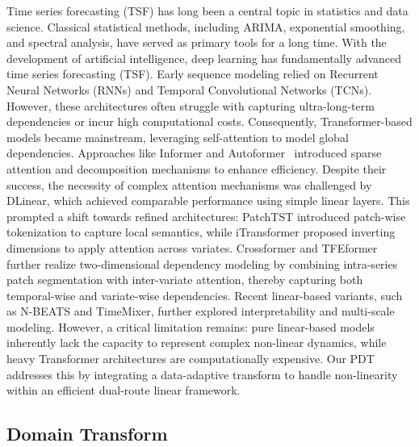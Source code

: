 \documentclass[final,3p,times]{elsarticle}
\begin{document}
Time series forecasting (TSF) has long been a central topic in statistics and data science. Classical statistical methods, including ARIMA\cite{box2015time}, exponential smoothing\cite{gardner1985exponential}, and spectral analysis\cite{koopmans1995spectral}, have served as primary tools for a long time. With the development of artificial intelligence, deep learning has fundamentally advanced time series forecasting (TSF). Early sequence modeling relied on Recurrent Neural Networks (RNNs)\cite{yu2019review,salinas2020deepar} and Temporal Convolutional Networks (TCNs)\cite{bai2018empirical, wu2023timesnet}. However, these architectures often struggle with capturing ultra-long-term dependencies or incur high computational costs. Consequently, Transformer-based models became mainstream, leveraging self-attention to model global dependencies\cite{wen2023trans}. Approaches like Informer\cite{zhou2021informer} and Autoformer~\cite{wu2021autoformer} introduced sparse attention and decomposition mechanisms to enhance efficiency. Despite their success, the necessity of complex attention mechanisms was challenged by DLinear\cite{zeng2023transformers}, which achieved comparable performance using simple linear layers. This prompted a shift towards refined architectures: PatchTST\cite{nie2023a} introduced patch-wise tokenization to capture local semantics, while iTransformer\cite{liu2024itransformer} proposed inverting dimensions to apply attention across variates. Crossformer\cite{zhang2023crossformer} and TFEformer\cite{ying2024tfeformer} further realize two-dimensional dependency modeling by combining intra-series patch segmentation with inter-variate attention, thereby capturing both temporal-wise and variate-wise dependencies. Recent linear-based variants, such as N-BEATS\cite{oreshkin2019n} and TimeMixer\cite{wang2024timemixer}, further explored interpretability and multi-scale modeling. However, a critical limitation remains: pure linear-based models inherently lack the capacity to represent complex non-linear dynamics, while heavy Transformer architectures are computationally expensive. Our PDT addresses this by integrating a data-adaptive transform to handle non-linearity within an efficient dual-route linear framework.

\subsection{Domain Transform}
\end{document}
